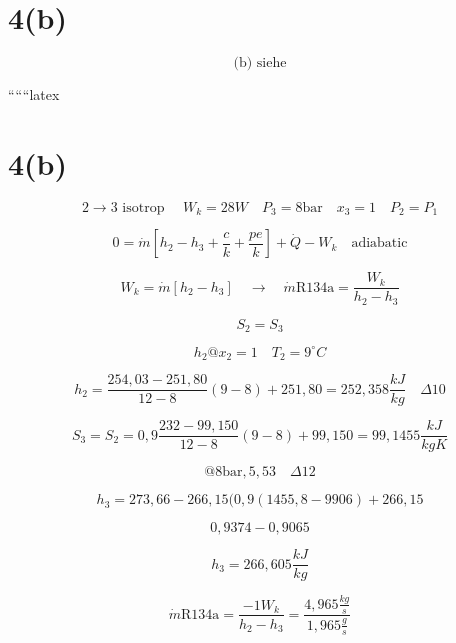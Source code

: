 \section*{4(b)}

\[
\text{(b) siehe}
\]

``````latex

\section*{4(b)}


\[
2 \rightarrow 3 \text{ isotrop } \quad W_k = 28W \quad P_3 = 8 \text{bar} \quad x_3 = 1 \quad P_2 = P_1
\]

\[
0 = \dot{m} \left[ h_2 - h_3 + \frac{c}{k} + \frac{pe}{k} \right] + \dot{Q} - W_k \quad \text{adiabatic}
\]

\[
W_k = \dot{m} \left[ h_2 - h_3 \right] \quad \rightarrow \quad \dot{m} \text{R134a} = \frac{W_k}{h_2 - h_3}
\]

\[
S_2 = S_3
\]

\[
h_2 @ x_2 = 1 \quad T_2 = 9^\circ C
\]

\[
h_2 = \frac{254,03 - 251,80}{12 - 8} (9 - 8) + 251,80 = 252,358 \frac{kJ}{kg} \quad \Delta 10
\]

\[
S_3 = S_2 = 0,9 \frac{232 - 99,150}{12 - 8} (9 - 8) + 99,150 = 99,1455 \frac{kJ}{kgK}
\]

\[
@ 8 \text{bar}, 5,53 \quad \Delta 12
\]

\[
h_3 = 273,66 - 266,15 (0,9 (1455,8 - 9906) + 266,15
\]

\[
0,9374 - 0,9065
\]

\[
h_3 = 266,605 \frac{kJ}{kg}
\]

\[
\dot{m} \text{R134a} = \frac{-1 W_k}{h_2 - h_3} = \frac{4,965 \frac{kg}{s}}{1,965 \frac{g}{s}}
\]